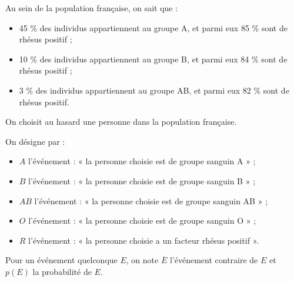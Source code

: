 \documentclass[11pt,a4paper]{article}
\begin{document}
Au sein de la population française, on sait que :
\begin{itemize}
  \item 45 \% des individus appartiennent au groupe A, et parmi eux 85 \% sont de rhésus positif ;
  \item 10 \% des individus appartiennent au groupe B, et parmi eux 84 \% sont de rhésus positif ;
  \item 3 \% des individus appartiennent au groupe AB, et parmi eux 82 \% sont de rhésus positif.
\end{itemize}

On choisit au hasard une personne dans la population française.

On désigne par :
\begin{itemize}
  \item $A$ l'événement : « la personne choisie est de groupe sanguin A » ;
  \item $B$ l'événement : « la personne choisie est de groupe sanguin B » ;
  \item $AB$ l'événement : « la personne choisie est de groupe sanguin AB » ;
  \item $O$ l'événement : « la personne choisie est de groupe sanguin O » ;
  \item $R$ l'événement : « la personne choisie a un facteur rhésus positif ».
\end{itemize}

Pour un événement quelconque $E$, on note $\overline E$ l'événement contraire de $E$ et $p(E)$ la probabilité de $E$.

\begin{center}
\end{center}
\end{document}
